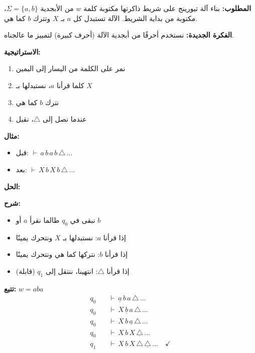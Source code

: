\documentclass[14pt]{extarticle}
\begin{document}
\textbf{المطلوب:} بناء آلة تيورينج على شريط ذاكرتها مكتوبة كلمة $w$ من الأبجدية $\Sigma = \{a, b\}$، مكتوبة من بداية الشريط. الآلة تستبدل كل $a$ بـ $X$ وتترك $b$ كما هي.

\textbf{الفكرة الجديدة:} نستخدم أحرفًا من أبجدية الآلة (أحرف كبيرة) لتمييز ما عالجناه.

\textbf{الاستراتيجية:}
\begin{enumerate}
    \item نمر على الكلمة من اليسار إلى اليمين
    \item كلما قرأنا $a$، نستبدلها بـ $X$
    \item نترك $b$ كما هي
    \item عندما نصل إلى $\triangle$، نقبل
\end{enumerate}

\textbf{مثال:}
\begin{itemize}
    \item قبل: $\vdash \, a \, b \, a \, b \, \triangle \, \ldots$
    \item بعد: $\vdash \, X \, b \, X \, b \, \triangle \, \ldots$
\end{itemize}

\textbf{الحل:}

\begin{center}
\end{center}

\textbf{شرح:}
\begin{itemize}
    \item نبقى في $q_0$ طالما نقرأ $a$ أو $b$
    \item إذا قرأنا $a$: نستبدلها بـ $X$ ونتحرك يمينًا
    \item إذا قرأنا $b$: نتركها كما هي ونتحرك يمينًا
    \item إذا قرأنا $\triangle$: انتهينا، ننتقل إلى $q_1$ (قابلة)
\end{itemize}

\textbf{تتبع:} $w = aba$
\begin{align*}
q_0 \quad &\vdash \, \underline{a} \, b \, a \, \triangle \, \ldots \\
q_0 \quad &\vdash \, X \, \underline{b} \, a \, \triangle \, \ldots \\
q_0 \quad &\vdash \, X \, b \, \underline{a} \, \triangle \, \ldots \\
q_0 \quad &\vdash \, X \, b \, X \, \underline{\triangle} \, \ldots \\
q_1 \quad &\vdash \, X \, b \, X \, \triangle \, \underline{\triangle} \, \ldots \quad \checkmark
\end{align*}
\end{document}
